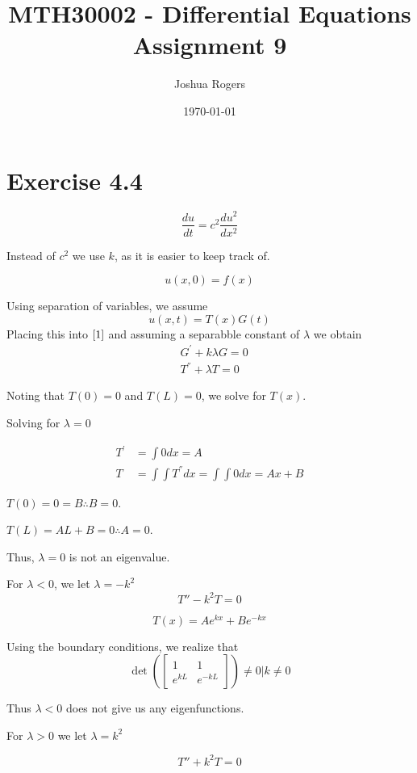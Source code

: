 \documentclass{article}
\title{\vspace{-4cm}MTH30002 - Differential Equations Assignment 9}
\author{Joshua Rogers}
\date\today
\begin{document}
\maketitle
\section*{Exercise 4.4}

\begin{equation}\label{1}
\frac{du}{dt} = c^2 \frac{du^2}{dx^2}
\end{equation}

Instead of $c^2$ we use $k$, as it is easier to keep track of.

$$
u(x,0) = f(x)
$$

Using separation of variables, we assume
\begin{equation}\label{2}
u(x,t) = T(x)G(t)
\end{equation}
Placing this into $\eqref{1}$ and assuming a separabble constant of $\lambda$ we obtain
\begin{align*}
&G^{'} + k\lambda G = 0\\
&T^{''} + \lambda T =0
\end{align*}

Noting that $T(0)=0$ and $T(L)=0$, we solve for $T(x)$.

Solving for $\lambda=0$

\begin{align*}
T^{'} &= \int 0 dx =  A \\
T &= \int \int T^{''} dx = \int \int 0 dx = Ax+B
\end{align*}

$T(0) = 0 =B \therefore B = 0$.


$T(L) = AL + B = 0 \therefore A =0$.


Thus, $\lambda =0$ is not an eigenvalue.


For $\lambda <0$, we let $\lambda = -k^2$
$$
T''-k^2T=0
$$

$$T(x) = Ae^{kx} + Be^{-kx}$$

Using the boundary conditions, we realize that 
$$\det \left( \begin{bmatrix} 1 & 1 \\ e^{kL} & e^{-kL} \end{bmatrix} \right) \neq 0 \Bigr| k \neq 0 $$

Thus $\lambda <0$ does not give us any eigenfunctions.


For $\lambda > 0$ we let $\lambda = k^2$

$$ T''+k^2T=0$$
\end{document}
